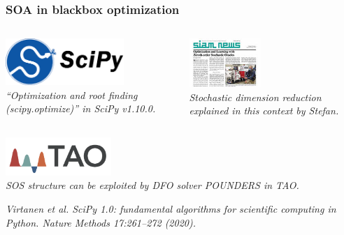 \documentclass[aspectratio=169]{beamer}
\begin{document}
\begin{frame}\frametitle{SOA in blackbox optimization}
\begin{columns}
\begin{column}{0.5\textwidth}
\begin{center}
\includegraphics[width=0.7\textwidth]{../img/logos/logo-scipy.png}\\
{\tiny \sl
``Optimization and root finding (scipy.optimize)'' in SciPy v1.10.0.\\
}
\end{center}
\end{column}
\begin{column}{0.5\textwidth}
\begin{center}
\includegraphics[height=5em]{../img/probs/siam_news_feb_23.jpg}\\
{\tiny \sl
Stochastic dimension reduction explained in this context
by Stefan.\\
}
\end{center}
\end{column}
\end{columns}

\bigskip

\begin{center}
\includegraphics[width=0.3\textwidth]{../img/logos/logo-tao.png}\\
{\tiny \sl
SOS structure can be exploited by DFO solver POUNDERS in TAO.\\
}
\end{center}

\vfill

{\tiny\it
Virtanen et al.
SciPy 1.0: fundamental algorithms for scientific computing in Python.
{\sl Nature Methods 17:261--272 (2020).}\\
}


\end{frame}
\end{document}
